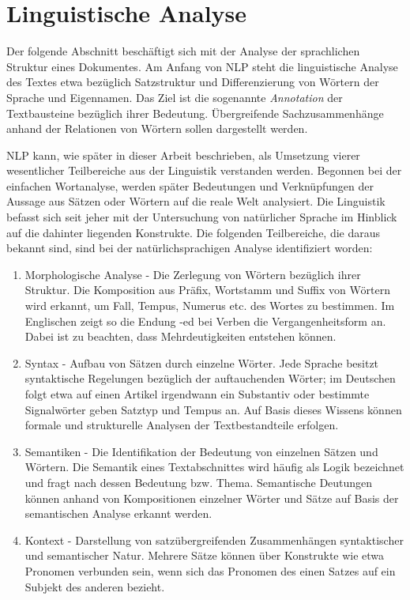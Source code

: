 \documentclass[12pt]{report}
\begin{document}
\section{Linguistische Analyse}
Der folgende Abschnitt beschäftigt sich mit der Analyse der sprachlichen Struktur eines Dokumentes. Am Anfang von NLP steht die linguistische Analyse des Textes etwa bezüglich Satzstruktur und Differenzierung von Wörtern der Sprache und Eigennamen. Das Ziel ist die sogenannte \textit{Annotation} der Textbausteine bezüglich ihrer Bedeutung. Übergreifende Sachzusammenhänge anhand der Relationen von Wörtern sollen dargestellt werden.

NLP kann, wie später in dieser Arbeit beschrieben, als Umsetzung vierer wesentlicher Teilbereiche aus der Linguistik verstanden werden. Begonnen bei der einfachen Wortanalyse, werden später Bedeutungen und Verknüpfungen der Aussage aus Sätzen oder Wörtern auf die reale Welt analysiert. Die Linguistik befasst sich seit jeher mit der Untersuchung von natürlicher Sprache im Hinblick auf die dahinter liegenden Konstrukte. Die folgenden Teilbereiche, die daraus bekannt sind, sind bei der natürlichsprachigen Analyse identifiziert worden:

\begin{enumerate}
\item
Morphologische Analyse - Die Zerlegung von Wörtern bezüglich ihrer Struktur. Die Komposition aus Präfix, Wortstamm und Suffix von Wörtern wird erkannt, um Fall, Tempus, Numerus etc. des Wortes zu bestimmen. Im Englischen zeigt so die Endung -ed bei Verben die Vergangenheitsform an. Dabei ist zu beachten, dass Mehrdeutigkeiten entstehen können.
\item
Syntax - Aufbau von Sätzen durch einzelne Wörter. Jede Sprache besitzt syntaktische Regelungen bezüglich der auftauchenden Wörter; im Deutschen folgt etwa auf einen Artikel irgendwann ein Substantiv oder bestimmte Signalwörter geben Satztyp und Tempus an. Auf Basis dieses Wissens können formale und strukturelle Analysen der Textbestandteile erfolgen.
\item
Semantiken - Die Identifikation der Bedeutung von einzelnen Sätzen und Wörtern. Die Semantik eines Textabschnittes wird häufig als \glqq  Logik\grqq{} bezeichnet und fragt nach dessen Bedeutung bzw. Thema. Semantische Deutungen können anhand von Kompositionen einzelner Wörter und Sätze auf Basis der semantischen Analyse erkannt werden.
\item
Kontext - Darstellung von satzübergreifenden Zusammenhängen syntaktischer und semantischer Natur. Mehrere Sätze können über Konstrukte wie etwa Pronomen verbunden sein, wenn sich das Pronomen des einen Satzes auf ein Subjekt des anderen bezieht. 
\end{enumerate}
\end{document}
